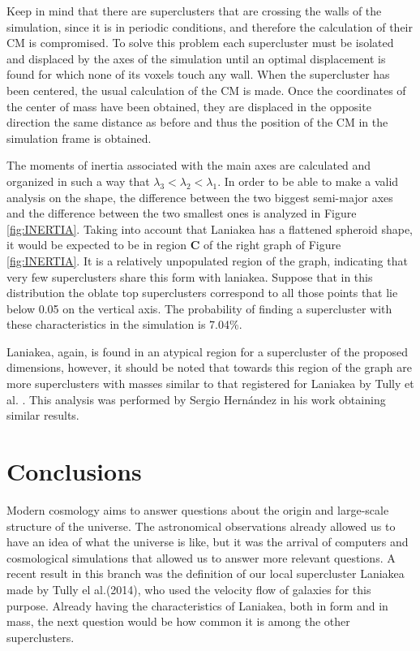 \documentclass[a4paper,fleqn,usenatbib]{mnras}
\begin{document}
Keep in mind that there are superclusters that are crossing the walls of the simulation, since it is in periodic conditions, and therefore the calculation of their CM is compromised. To solve this problem each supercluster must be isolated and displaced by the axes of the simulation until an optimal displacement is found for which none of its voxels touch any wall. When the supercluster has been centered, the usual calculation of the CM is made. Once the coordinates of the center of mass have been obtained, they are displaced in the opposite direction the same distance as before and thus the position of the CM in the simulation frame is obtained.

The moments of inertia associated with the main axes are calculated and organized in such a way that $ \lambda_3 < \lambda_2 < \lambda_1 $. In order to be able to make a valid analysis on the shape, the difference between the two biggest semi-major axes and the difference between the two smallest ones is analyzed in Figure \ref{fig:INERTIA}. Taking into account that Laniakea has a flattened spheroid shape, it would be expected to be in region \textbf{C} of the right graph of Figure \ref{fig:INERTIA}. It is a relatively unpopulated region of the graph, indicating that very few superclusters share this form with laniakea. Suppose that in this distribution the oblate top superclusters correspond to all those points that lie below 0.05 on the vertical axis. The probability of finding a supercluster with these characteristics in the simulation is 7.04\%.

Laniakea, again, is found in an atypical region for a supercluster of the proposed dimensions, however, it should be noted that towards this region of the graph are more superclusters with masses similar to that registered for Laniakea by Tully et  al. \cite{tully_laniakea_2014}. This analysis was performed by Sergio Hernández in his work\cite{SHC_TESIS} obtaining similar results.










\section{Conclusions}
\label{sec:conclusions}
Modern cosmology aims to answer questions about the origin and large-scale structure of the universe. The astronomical observations already allowed us to have an idea of what the universe is like, but it was the arrival of computers and cosmological simulations that allowed us to answer more relevant questions.
A recent result in this branch was the definition of our local supercluster Laniakea made by Tully el al.(2014)\cite{tully_laniakea_2014}, who used the velocity flow of galaxies for this purpose. Already having the characteristics of Laniakea, both in form and in mass, the next question would be how common it is among the other superclusters.
\end{document}
